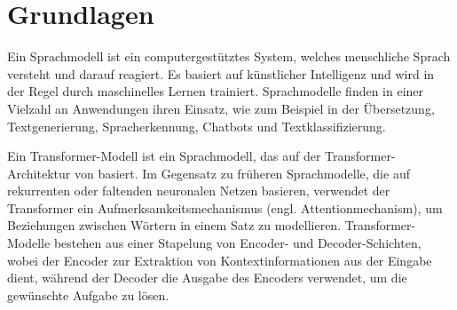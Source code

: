 \chapter{Grundlagen}\label{ch:preliminaries}

\begin{definition}[Sprachmodell]\label{def:sprachmodell}
     Ein Sprachmodell ist ein computergestütztes System, welches menschliche Sprach versteht und darauf reagiert.
    Es basiert auf künstlicher Intelligenz und wird in der Regel durch maschinelles Lernen trainiert.
    Sprachmodelle finden in einer Vielzahl an Anwendungen ihren Einsatz, wie zum Beispiel in der Übersetzung,
    Textgenerierung, Spracherkennung, Chatbots und Textklassifizierung.
\end{definition}

\begin{definition}\label{def:transformer-modell}
    Ein Transformer-Modell ist ein Sprachmodell, das auf der Transformer-Architektur von \citet{attention} basiert.
    Im Gegensatz zu früheren Sprachmodelle, die auf rekurrenten oder faltenden neuronalen Netzen basieren,
    verwendet der Transformer ein Aufmerksamkeitsmechanismus (engl. Attentionmechanism), um Beziehungen zwischen Wörtern in einem Satz zu modellieren.
    Transformer-Modelle bestehen aus einer Stapelung von Encoder- und Decoder-Schichten, wobei der Encoder zur Extraktion von Kontextinformationen aus der Eingabe dient,
    während der Decoder die Ausgabe des Encoders verwendet, um die gewünschte Aufgabe zu lösen.
\end{definition}

